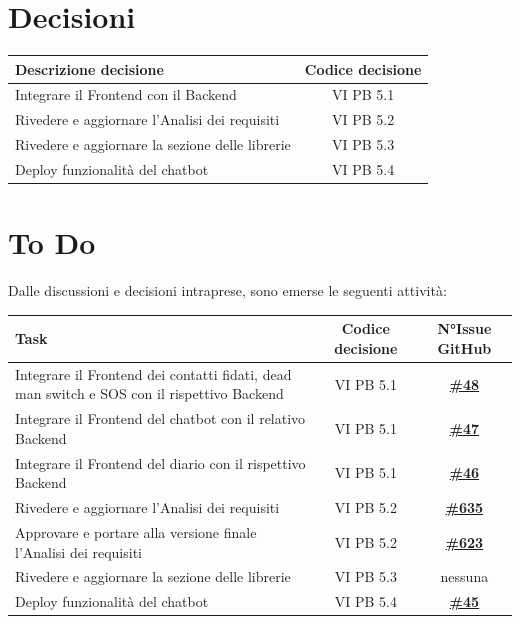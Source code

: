 \documentclass[a4paper,12pt]{article}
\newcommand{\ignoreglossary}{}
\begin{document}
\section{Decisioni}
\begin{center}
\small
\renewcommand{\arraystretch}{1.2} 
\begin{tabular}{|p{}|c|}
\hline
\rowcolor{gray!60} 
\textbf{Descrizione decisione} & \textbf{Codice decisione} \\
\hline
Integrare il Frontend con il Backend & VI \ignoreglossary{PB} 5.1 \\
\hline
Rivedere e aggiornare l'Analisi dei requisiti & VI \ignoreglossary{PB} 5.2 \\
\hline
Rivedere e aggiornare la sezione delle librerie & VI \ignoreglossary{PB} 5.3 \\
\hline
Deploy funzionalità del chatbot & VI \ignoreglossary{PB} 5.4 \\
\hline
\end{tabular}
\end{center}
\pagebreak

\section{To Do}
Dalle discussioni e decisioni intraprese, sono emerse le seguenti attività:

\begin{center}
\small
\renewcommand{\arraystretch}{1.2} 
\begin{tabular}{|p{}|c|c|}
\hline
\rowcolor{gray!60} 
\textbf{Task} & \textbf{Codice decisione} & \textbf{N°Issue GitHub} \\
\hline
Integrare il Frontend dei contatti fidati, dead man switch e SOS con il rispettivo Backend & VI PB 5.1 & \href{https://github.com/SWE-BitByBit/project-MVP/issues/48}{\textbf{\#48}} \\
\hline
Integrare il Frontend del chatbot con il relativo Backend & VI PB 5.1 & \href{https://github.com/SWE-BitByBit/project-MVP/issues/47}{\textbf{\#47}} \\
\hline
Integrare il Frontend del diario con il rispettivo Backend & VI PB 5.1 & \href{https://github.com/SWE-BitByBit/project-MVP/issues/46}{\textbf{\#46}} \\
\hline
Rivedere e aggiornare l'Analisi dei requisiti & VI PB 5.2 & \href{https://github.com/SWE-BitByBit/SWE-docs/issues/635}{\textbf{\#635}} \\
\hline
Approvare e portare alla versione finale l'Analisi dei requisiti & VI PB 5.2 & \href{https://github.com/SWE-BitByBit/SWE-docs/issues/623}{\textbf{\#623}} \\
\hline
Rivedere e aggiornare la sezione delle librerie & VI PB 5.3 & nessuna \\
\hline
Deploy funzionalità del chatbot & VI PB 5.4 & \href{https://github.com/SWE-BitByBit/project-MVP/issues/45}{\textbf{\#45}} \\
\hline
\end{tabular}
\end{center}
\end{document}
